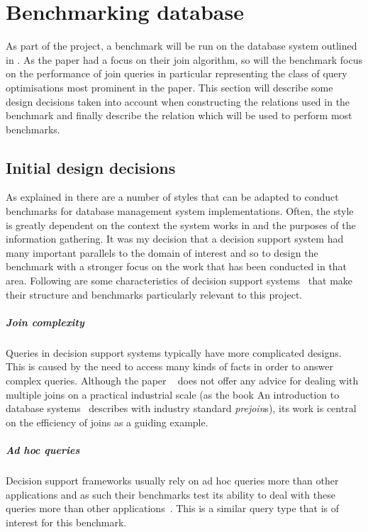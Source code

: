 \section{Benchmarking database}
As part of the project, a benchmark will be run on the database system outlined
in . As the paper \relalg{} had a focus on their join algorithm, so will the benchmark focus
on the performance of join queries in particular representing the class of query
optimisations most prominent in the paper. This section will describe some design
decisions taken into account when constructing the relations used in the
benchmark and finally describe the  relation which will be
used to perform most benchmarks.

\subsection{Initial design decisions}
As explained in  there are a number of styles that can be adapted to
conduct benchmarks for database management system implementations. Often, the
style is greatly dependent on the context the system works in and the purposes
of the information gathering. It was my decision that a decision support system
had many important parallels to the domain of interest and so to design the
benchmark with a stronger focus on the work that has been conducted in that
area. Following are some characteristics of decision support
systems~\cite{IntroToDatabaseSystems}
that make their structure and benchmarks particularly relevant to this
project.

\subparagraph{Join complexity} Queries in decision support systems typically
have more complicated designs. This is caused by the need to access many
kinds of facts in order to answer complex queries. Although the
paper \relalg{}~\cite{RelationalAlgebraByWayOfAdjunctions}
does not offer any advice for dealing with multiple joins on a practical
industrial scale (as the book An introduction to database
systems~\cite{IntroToDatabaseSystems} describes with industry
standard \emph{prejoin}s), its work is central on the efficiency of joins as a
guiding example.

\subparagraph{Ad hoc queries} Decision support frameworks usually rely on ad hoc
queries more than other applications and as such their benchmarks test its
ability to deal with these queries more than other applications~\cite{SetQueryBenchmark, PractitionersIntroduction}. This is a similar
query type that is of interest for this benchmark.

